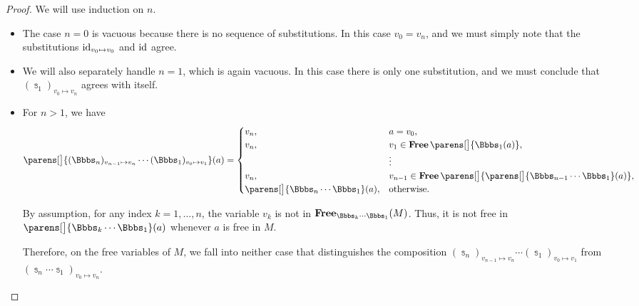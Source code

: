 \begin{proof}
  We will use induction on \( n \).
  \begin{itemize}
    \item The case \( n = 0 \) is vacuous because there is no sequence of substitutions. In this case \( v_0 = v_n \), and we must simply note that the substitutions \( \operatorname{id}_{v_0 \mapsto v_0} \) and \( \operatorname{id} \) agree.

    \item We will also separately handle \( n = 1 \), which is again vacuous. In this case there is only one substitution, and we must conclude that \( (\Bbbs_1)_{v_0 \mapsto v_n} \) agrees with itself.

    \item For \( n > 1 \), we have
    \begin{equation*}
      \parens[\big]{ (\Bbbs_n)_{v_{n-1} \mapsto v_n} \cdots (\Bbbs_1)_{v_0 \mapsto v_1} }(a)
      =
      \begin{cases}
        v_n,                                        &a = v_0, \\
        v_n,                                        &v_1 \in \op*{Free}\parens[\big]{ \Bbbs_1(a) }, \\
                                                    &\vdots \\
        v_n,                                        &v_{n-1} \in \op*{Free}\parens[\big]{ \parens[\big]{ \Bbbs_{n-1} \cdots \Bbbs_1 }(a) }, \\
        \parens[\big]{ \Bbbs_n \cdots \Bbbs_1 }(a), &\T{otherwise.}
      \end{cases}
    \end{equation*}

    By assumption, for any index \( k = 1, \ldots, n \), the variable \( v_k \) is not in \( \op*{Free}_{\Bbbs_k \cdots \Bbbs_1}(M) \). Thus, it is not free in \( \parens[\big]{ \Bbbs_k \cdots \Bbbs_1 }(a) \) whenever \( a \) is free in \( M \).

    Therefore, on the free variables of \( M \), we fall into neither case that distinguishes the composition \( (\Bbbs_n)_{v_{n-1} \mapsto v_n} \cdots (\Bbbs_1)_{v_0 \mapsto v_1} \) from \( (\Bbbs_n \cdots \Bbbs_1)_{v_0 \mapsto v_n} \).
  \end{itemize}
\end{proof}

